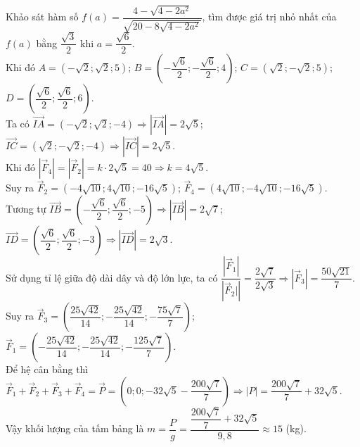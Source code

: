 \begin{bt}
{	Khảo sát hàm số $f(a)=\dfrac{4-\sqrt{4-2a^2}}{\sqrt{20-8\sqrt{4-2a^2}}}$, tìm được giá trị  nhỏ nhất của $f(a)$ bằng $\dfrac{\sqrt{3}}{2}$ khi $a=\dfrac{\sqrt{6}}{2}$.\\
	Khi đó $A=\left(-\sqrt{2}; \sqrt{2}; 5\right)$; $B=\left(-\dfrac{\sqrt{6}}{2};-\dfrac{\sqrt{6}}{2}; 4\right)$; $C=\left(\sqrt{2}; -\sqrt{2};  5\right)$; $D=\left(\dfrac{\sqrt{6}}{2}; \dfrac{\sqrt{6}}{2}; 6\right)$.\\
	Ta có $\overrightarrow{IA}=\left(-\sqrt{2}; \sqrt{2}; -4\right)\Rightarrow  \left|\overrightarrow{IA}\right|=2\sqrt{5}$; $\overrightarrow{IC}=\left(\sqrt{2}; -\sqrt{2}; -4\right)\Rightarrow \left|\overrightarrow{IC}\right|=2\sqrt{5}$.\\
	Khi  đó $\left|\overrightarrow{F}_4\right|=\left|\overrightarrow{F}_2\right|=k\cdot2\sqrt{5}=40\Rightarrow k=4\sqrt{5}$.\\
	Suy ra $\overrightarrow{F}_2=\left(-4\sqrt{10}; 4\sqrt{10};  -16\sqrt{5}\right)$; $\overrightarrow{F}_4=\left(4\sqrt{10}; -4\sqrt{10}; -16\sqrt{5}\right)$.\\
	 Tương tự $\overrightarrow{IB}=\left(-\dfrac{\sqrt{6}}{2}; \dfrac{\sqrt{6}}{2}; -5\right)\Rightarrow \left|\overrightarrow{IB}\right|=2\sqrt{7}$; $\overrightarrow{ID}=\left(\dfrac{\sqrt{6}}{2}; \dfrac{\sqrt{6}}{2}; -3\right)\Rightarrow \left|\overrightarrow{ID}\right|=2\sqrt{3}$.\\
	Sử dụng tỉ lệ giữa  độ dài dây và độ lớn lực, ta có $\dfrac{\left|\overrightarrow{F}_1\right|}{\left|\overrightarrow{F}_2|\right|}=\dfrac{2\sqrt{7}}{2\sqrt{3}}\Rightarrow \left|\overrightarrow{F}_3\right|=\dfrac{50\sqrt{21}}{7}$.\\
	Suy ra $\overrightarrow{F}_3=\left(\dfrac{25\sqrt{42}}{14}; -\dfrac{25\sqrt{42}}{14};  -\dfrac{75\sqrt{7}}{7}\right)$; $\overrightarrow{F}_1=\left(-\dfrac{25\sqrt{42}}{14}; -\dfrac{25\sqrt{42}}{14}; -\dfrac{125\sqrt{7}}{7}\right)$.\\
	Để hệ cân bằng thì $\overrightarrow{F}_1+\overrightarrow{F}_2+\overrightarrow{F}_3+\overrightarrow{F}_4=\overrightarrow{P}=\left(0; 0; -32\sqrt{5}-\dfrac{200\sqrt{7}}{7}\right)\Rightarrow  \left|P\right|=\dfrac{200\sqrt{7}}{7}+32\sqrt{5}$.\\
	Vậy khối lượng của tấm bảng là $m=\dfrac{P}{g}=\dfrac{\dfrac{200\sqrt{7}}{7}+32\sqrt{5}}{9{,}8}\approx15$  (kg).
	} 
\end{bt}

